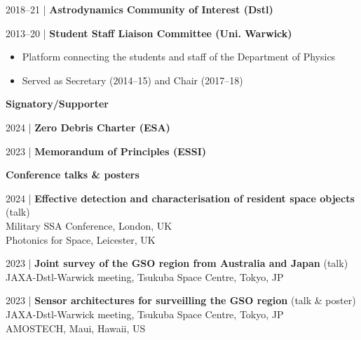 \documentclass[10pt,a4paper]{altacv}
\begin{document}
\small 2018--21 | \textbf{Astrodynamics Community of Interest (Dstl)} \\

\smallskip

\small 2013--20 | \textbf{Student Staff Liaison Committee (Uni. Warwick)} \\
\smallskip
\begin{itemize}
	\item Platform connecting the students and staff of the Department of Physics
	\item Served as Secretary (2014--15) and Chair (2017--18)
\end{itemize}

\divider

\normalsize \textbf{Signatory/Supporter}

\medskip

\small 2024 | \textbf{Zero Debris Charter (ESA)} \\

\smallskip

\small 2023 | \textbf{Memorandum of Principles (ESSI)} \\

\smallskip

\medskip




\normalsize \textbf{Conference talks \& posters}

\medskip

\small 2024 | \textbf{Effective detection and characterisation of resident space objects} (talk) \\
Military SSA Conference, London, UK \\
Photonics for Space, Leicester, UK


\small 2023 | \textbf{Joint survey of the GSO region from Australia and Japan} (talk) \\
JAXA-Dstl-Warwick meeting, Tsukuba Space Centre, Tokyo, JP

\smallskip

\small 2023 | \textbf{Sensor architectures for surveilling the GSO region} (talk \& poster) \\
JAXA-Dstl-Warwick meeting, Tsukuba Space Centre, Tokyo, JP \\
AMOSTECH, Maui, Hawaii, US 
\end{document}
